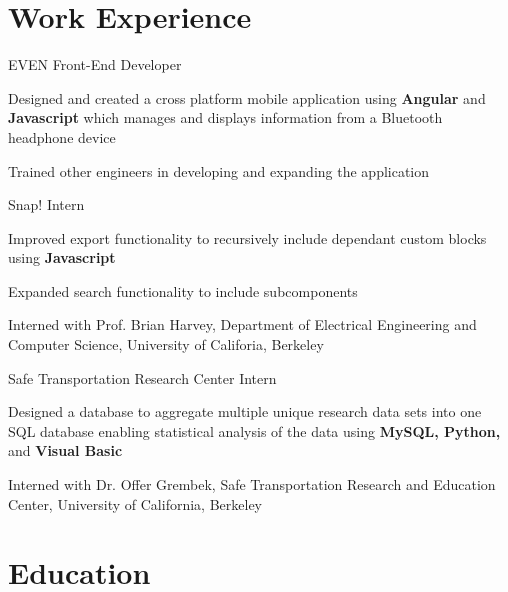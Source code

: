 \documentclass[10pt]{article}
\begin{document}
\begin{paracol}{2} %


\section{Work Experience}


{}
{EVEN}
{Front-End Developer}
{}
{
\item Designed and created a cross platform mobile application using \textbf{Angular}
  and \textbf{Javascript} which manages and displays information from a Bluetooth
  headpho\-ne device
\item Trained other engineers in developing and expanding the application
}

{}
{Snap!}
{Intern}
{}
{
\item Improved export functionality to recursively include dependant custom
  blocks using \textbf{Javascript}
\item Expanded search functionality to include subcomponents
\item Interned with Prof. Brian Harvey, Department of Electrical Engineering
  and Computer Science, University of Califoria, Berkeley
}

{}
{Safe Transportation Research Center}
{Intern}
{}
{
  \item Designed a database to aggregate multiple
    unique research data sets into one SQL database
    enabling statistical analysis of the data using
    \textbf{MySQL, Python,} and \textbf{Visual Basic}
  \item Interned with Dr. Offer Grembek, Safe Transportation
    Research and Education Center, University of California,
    Berkeley
}

\vspace{-\baselineskip}\medskip

\section{Education}


\end{paracol}
\end{document}
